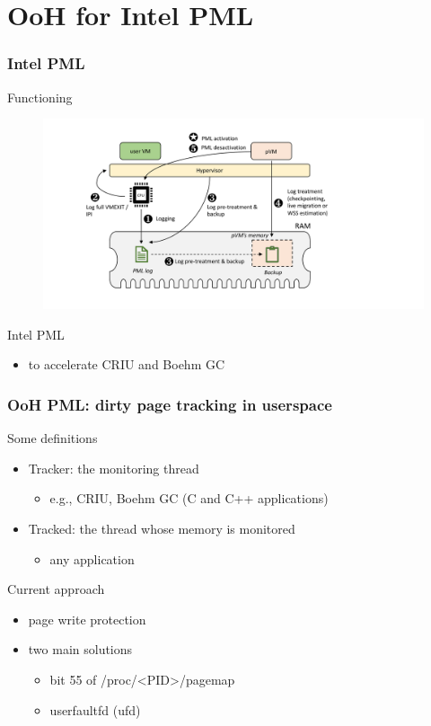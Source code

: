 \documentclass[xcolor=table,bigger,unknownkeysallowed]{beamer}
\begin{document}
\section{OoH for Intel PML}
        \begin{frame}
        \frametitle{Intel PML} 
			\begin{block}{Functioning}
 		    \begin{figure}
			\centering
				\includegraphics[width=.55\columnwidth]{fig/pmlactualDesign_v2}
			\end{figure}
			\end{block}
			\begin{block}{Intel PML}
				\begin{itemize}
					\item to accelerate CRIU and Boehm GC
				\end{itemize}
			\end{block}				
        \end{frame}
        \begin{frame}
        \frametitle{OoH PML: dirty page tracking in userspace} 
			\begin{block}{Some definitions}
				\begin{itemize}
					\item Tracker: the monitoring thread
					\begin{itemize}
						\item e.g., CRIU, Boehm GC (C and C++ applications)
					\end{itemize}
					\item Tracked: the thread whose memory is monitored
					\begin{itemize}
						\item any application
					\end{itemize}
				\end{itemize}
			\end{block}
			\begin{block}{Current approach}
				\begin{itemize}
					\item page write protection
					\item two main solutions
					\begin{itemize}
						\item bit 55 of /proc/<PID>/pagemap
						\item userfaultfd (ufd)
					\end{itemize}
				\end{itemize}
			\end{block}				
        \end{frame} 
\end{document}
